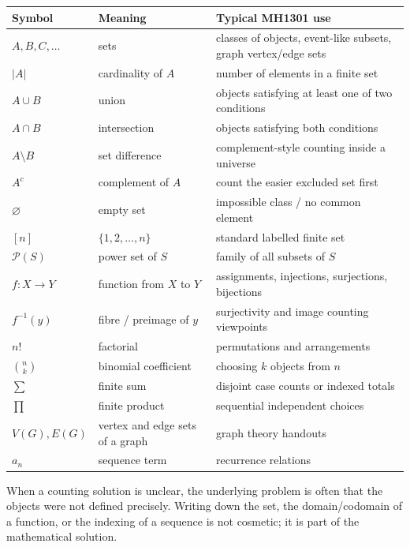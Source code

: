 \documentclass[12pt]{article}
\begin{document}
\begin{center}
\small
\begin{tabular}{@{}p{}p{}p{}@{}}
\toprule
\textbf{Symbol} & \textbf{Meaning} & \textbf{Typical MH1301 use} \\
\midrule
$A,B,C,\dots$ & sets & classes of objects, event-like subsets, graph vertex/edge sets \\
$|A|$ & cardinality of $A$ & number of elements in a finite set \\
$A\cup B$ & union & objects satisfying at least one of two conditions \\
$A\cap B$ & intersection & objects satisfying both conditions \\
$A\setminus B$ & set difference & complement-style counting inside a universe \\
$A^c$ & complement of $A$ & count the easier excluded set first \\
$\varnothing$ & empty set & impossible class / no common element \\
$[n]$ & $\{1,2,\dots,n\}$ & standard labelled finite set \\
$\mathcal{P}(S)$ & power set of $S$ & family of all subsets of $S$ \\
$f:X\to Y$ & function from $X$ to $Y$ & assignments, injections, surjections, bijections \\
$f^{-1}(y)$ & fibre / preimage of $y$ & surjectivity and image counting viewpoints \\
$n!$ & factorial & permutations and arrangements \\
$\binom{n}{k}$ & binomial coefficient & choosing $k$ objects from $n$ \\
$\sum$ & finite sum & disjoint case counts or indexed totals \\
$\prod$ & finite product & sequential independent choices \\
$V(G),E(G)$ & vertex and edge sets of a graph & graph theory handouts \\
$a_n$ & sequence term & recurrence relations \\
\bottomrule
\end{tabular}
\end{center}

\begin{commonmistake}[title={Notation errors are often conceptual errors}]
When a counting solution is unclear, the underlying problem is often that the objects were not defined precisely. Writing down the set, the domain/codomain of a function, or the indexing of a sequence is not cosmetic; it is part of the mathematical solution.
\end{commonmistake}
\end{document}

